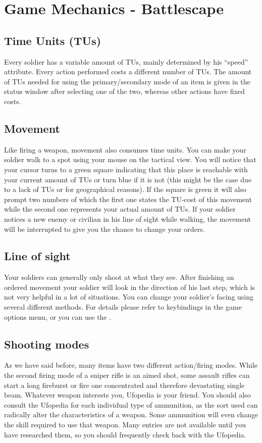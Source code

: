 \section{Game Mechanics - Battlescape}

\subsection{Time Units (TUs)}
Every soldier has a variable amount of TUs, mainly determined by his ``speed'' attribute. Every action performed costs a different number of TUs. The amount of TUs needed for using the primary/secondary mode of an item is given in the status window after selecting one of the two, whereas other actions have fixed costs.

\subsection{Movement}
Like firing a weapon, movement also consumes time units. You can make your soldier walk to a spot using your mouse on the tactical view. You will notice that your cursor turns to a green square indicating that this place is reachable with your current amount of TUs or turn blue if it is not (this might be the case due to a lack of TUs or for geographical reasons). If the square is green it will also prompt two numbers of which the first one states the TU-cost of this movement while the second one represents your actual amount of TUs. If your soldier notices a new enemy or civilian in his line of sight while walking, the movement will be interrupted to give you the chance to change your orders.

\subsection{Line of sight}
Your soldiers can generally only shoot at what they see. After finishing an ordered movement your soldier will look in the direction of his last step, which is not very helpful in a lot of situations. You can change your soldier's facing using several different methods.  For details please refer to keybindings in the game options menu, or you can use the .

\subsection{Shooting modes}
As we have said before, many items have two different action/firing modes. While the second firing mode of a sniper rifle is an aimed shot, some assault rifles can start a long fireburst or fire one concentrated and therefore devastating single beam. Whatever weapon interests you, Ufopedia is your friend. You should also consult the Ufopedia for each individual type of ammunition, as the sort used can radically alter the characteristics of a weapon. Some ammunition will even change the skill required to use that weapon. Many entries are not available until you have researched them, so you should frequently check back with the Ufopedia.

